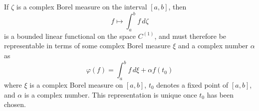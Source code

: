If $\zeta$ is a complex Borel measure on the interval $[a, b]$, then
$$f \mapsto \int_a^b f \, d\zeta$$
is a bounded linear functional on the space $C^{(1)}$, and must therefore be representable in terms of some complex Borel measure $\xi$ and a complex number $\alpha$ as
$$\varphi(f) = \int_a^b f \, d\xi + \alpha f(t_0)$$
where $\xi$ is a complex Borel measure on $[a, b]$, $t_0$ denotes a fixed point of $[a, b]$, and $\alpha$ is a complex number. This representation is unique once $t_0$ has been chosen.
